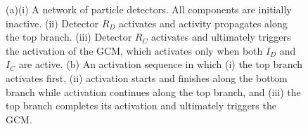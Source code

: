 \documentclass[10pt,letterpaper]{article}
\newcommand{\ev}[2]{$#1_#2$}
\begin{document}
\begin{figure}
\begin{center}
\hfill\null
\end{center}
\caption{(a)(i) A network of particle detectors. All components are initially inactive. (ii) Detector \ev{R}{D} activates and activity propagates along the top branch. (iii) Detector \ev{R}{C} activates and ultimately triggers the activation of the GCM, which activates only when both  \ev{I}{D} and \ev{I}{C} are active. (b) An activation sequence in which (i) the top branch activates first, (ii) activation starts and finishes along the bottom branch while activation continues along the top branch, and (iii) the top branch completes its activation and ultimately triggers the GCM.}
\label{fig:intro}
\end{figure}


\end{document}
